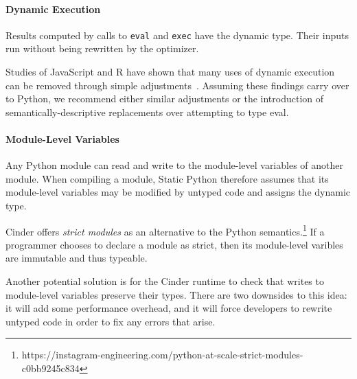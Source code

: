 \documentclass[english,cleveref,submission]{programming}
\newcommand{\SP}{Static Python}
\newcommand{\code}[1]{\texttt{#1}}
\begin{document}


\paragraph{Dynamic Execution}
Results computed by calls to \code{eval} and \code{exec}
have the dynamic type.
Their inputs run without being rewritten
by the optimizer.

Studies of JavaScript and R have shown that many uses of dynamic execution
can be removed through simple adjustments~\cite{rhbv-ecoop-2011,gdkkv-oopsla-2021,mrmv-esop-2012}.
Assuming these findings carry over to Python, we recommend either similar
adjustments or the introduction of semantically-descriptive replacements
over attempting to type eval.


\paragraph{Module-Level Variables}

Any Python module can read and write to the module-level variables of another module.
When compiling a module, \SP{} therefore assumes that its module-level variables
may be modified by untyped code and assigns the dynamic type.

Cinder offers \emph{strict modules} as an alternative to the Python
semantics.\footnote{https://instagram-engineering.com/python-at-scale-strict-modules-c0bb9245c834}
If a programmer chooses to declare a module as strict, then its module-level varibles
are immutable and thus typeable.

Another potential solution is for the Cinder runtime to check that writes to module-level variables
preserve their types.
There are two downsides to this idea:
it will add some performance overhead,
and it will force developers to rewrite untyped code in order to fix any errors that arise.
\end{document}
